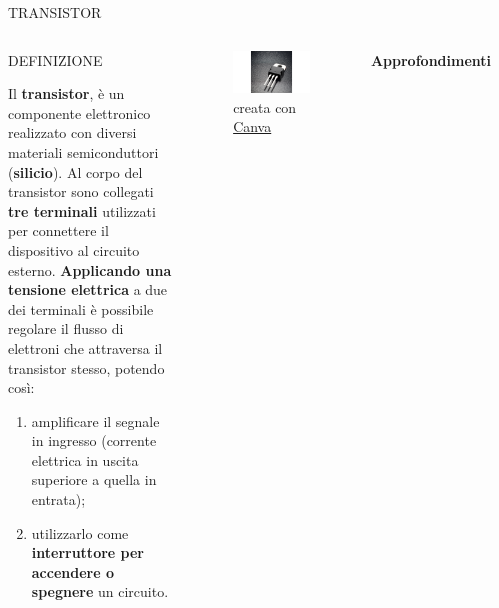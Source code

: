 \documentclass[aspectratio=1610]{beamer}
\begin{document}
\begin{frame}{TRANSISTOR}
    \begin{columns}
           \begin{alertblock}{DEFINIZIONE}
                \begin{minipage}{0.96\linewidth}
                    \justifying
                    Il \textbf{transistor}, è un componente elettronico realizzato 
                    con diversi materiali semiconduttori (\textbf{silicio}). 
                    Al corpo del transistor sono collegati \textbf{tre terminali} utilizzati 
                    per connettere il dispositivo al circuito esterno. \textbf{Applicando una tensione 
                    elettrica} a due dei terminali è possibile regolare il flusso di elettroni 
                    che attraversa il transistor stesso, potendo così:
                    \begin{enumerate}
                        \item amplificare il segnale in ingresso 
                        (corrente elettrica in uscita superiore a quella in entrata);
                        \item utilizzarlo come \textbf{interruttore per accendere o spegnere} un circuito.
                    \end{enumerate}
                \end{minipage}
           \end{alertblock}
            \begin{figure}
                \includegraphics[width=\linewidth]{img/transistor.png}
                \caption{{creata con \href{www.canva.com}{Canva}}}
            \end{figure}
            \tiny{\textbf{Approfondimenti}}
            \begin{itemize}

\end{itemize}
\end{columns}
\end{frame}
\end{document}

